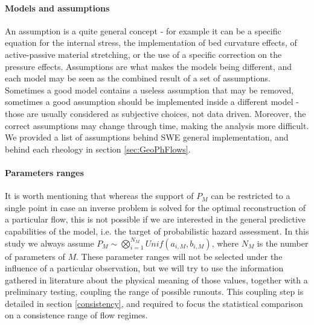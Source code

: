 \documentclass{article}
\begin{document}
\paragraph{Models and assumptions} An assumption is a quite general concept - for example it can be a specific equation for the internal stress, the implementation of bed curvature effects, of active-passive material stretching, or the use of a specific correction on the pressure effects. Assumptions are what makes the models being different, and each model may be seen as the combined result of a set of assumptions. Sometimes a good model contains a useless assumption that may be removed, sometimes a good assumption should be implemented inside a different model - those are usually considered as subjective choices, not data driven. Moreover, the correct assumptions may change through time, making the analysis more difficult. We provided a list of assumptions behind SWE general implementation, and behind each rheology in section \ref{sec:GeoPhFlows}.

\paragraph{Parameters ranges} It is worth mentioning that whereas the support of $P_M$ can be restricted to a single point in case an inverse problem is solved for the optimal reconstruction of a particular flow, this is not possible if we are interested in the general predictive capabilities of the model, i.e. the target of probabilistic hazard assessment. In this study we always assume $P_M\sim \bigotimes_{i=1}^{N_M} Unif(a_{i,M},b_{i,M})$, where $N_M$ is the number of parameters of $M$. These parameter ranges will not be selected under the influence of a particular observation, but we will try to use the information gathered in literature about the physical meaning of those values, together with a preliminary testing, coupling the range of possible runouts. This coupling step is detailed in section \ref{consistency}, and required to focus the statistical comparison on a consistence range of flow regimes.
\end{document}
